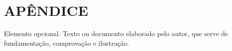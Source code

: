 \chapter*{APÊNDICE}
Elemento opcional. Texto ou documento elaborado pelo autor, que serve de fundamentação, comprovação e ilustração.